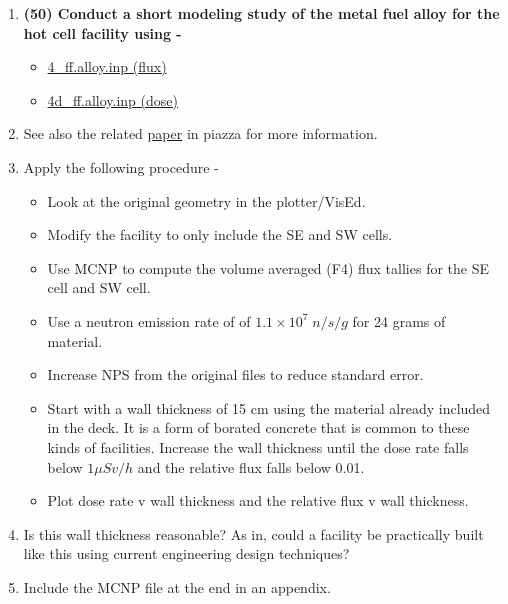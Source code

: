 \documentclass[11pt,a4paper]{article}
\begin{document}
\begin{enumerate}[leftmargin=*,topsep=0pt,font=\bfseries]
        \newpage 
    \item\textbf{(50) Conduct a short modeling study of the metal fuel alloy for the hot cell facility using - }
        \begin{itemize}[leftmargin=*,topsep=0pt]
            \item\href{https://github.com/TheDoctorRAB/mcnpx.decks/blob/master/neutron.flux/input/4_ff.alloy.inp}{4\_ff.alloy.inp (flux)}
            \item\href{https://github.com/TheDoctorRAB/mcnpx.decks/blob/master/neutron.flux/input/4d_ff.alloy.inp}{4d\_ff.alloy.inp (dose)}
        \end{itemize}
    \item[]See also the related \href{https://piazza.com/class_profile/get_resource/kbjsrzm65to4ul/kbjss2sfmbe4wu}{paper} in piazza for more information.
    \item[]Apply the following procedure - 
        \begin{itemize}
            \item Look at the original geometry in the plotter/VisEd.
            \item Modify the facility to only include the SE and SW cells.
            \item Use MCNP to compute the volume averaged (F4) flux tallies for the SE cell and SW cell.
            \item Use a neutron emission rate of of $1.1 \times 10^7 \; n/s/g$ for 24 grams of material. 
            \item Increase NPS from the original files to reduce standard error.
            \item Start with a wall thickness of 15 cm using the material already included in the deck. It is a form of borated concrete that is common to these kinds of facilities. Increase the wall thickness until the dose rate falls below $1 \mu Sv/h$ and the relative flux falls below 0.01.
            \item Plot dose rate v wall thickness and the relative flux v wall thickness.
        \end{itemize}
    \item[]Is this wall thickness reasonable? As in, could a facility be practically built like this using current engineering design techniques?
    \item[]Include the MCNP file at the end in an appendix.
        \vspace{0.25in}\\























\end{enumerate}
\end{document}
